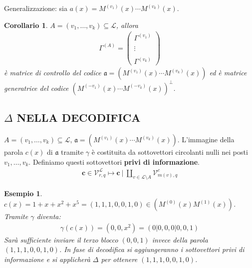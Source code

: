 \documentclass[mathserif]{beamer}
\newtheorem{esempio}{Esempio}
\newtheorem{corollario}{Corollario}
\begin{document}
\begin{frame}
  Generalizzazione: sia $a(x) = M^{(v_{1})}(x) \cdots M^{(v_{k})}(x)$.

    \begin{corollario}
      $A=(v_{1}, \dots, v_{k}) \subseteq \mathscr{L}$, allora
      \begin{align*}
	  \Gamma^{(A)}
	  =
	  \left(
	  \begin{array} { c }
	  \Gamma^{(v_{1})}  \\ \\
	  \vdots \\ \\
	  \Gamma^{(v_{k})}
	  \end{array}
	  \right)
      \end{align*}
      è matrice di controllo del codice $\mathfrak{a} = (  M^{(v_{1})}(x) \cdots M^{(v_{k})}(x) )$
      ed è matrice generatrice del codice $(  M^{(-v_{1})}(x)\cdots M^{(-v_{k})}(x) )^{\perp}$.
    \end{corollario}
\end{frame}




\subsection{$\Delta$ NELLA DECODIFICA}
\begin{frame}
   $A=(v_{1}, \dots, v_{k}) \subseteq \mathscr{L}$, $\mathfrak{a} = (  M^{(v_{1})}(x) \cdots  M^{(v_{k})}(x) )$.
   L'immagine della parola $c(x)$ di $\mathfrak{a}$ tramite $\gamma$ è costituita da sottovettori circolanti nulli nei posti $v_{1}, \dots, v_{k}$. Definiamo questi sottovettori {\bf privi di informazione}.
    \begin{align*}
      \mathbf{c} \in \mathcal{V}_{r, q}^{\mathscr{L}}
      \mapsto
      \mathbf{c} ~ \Bigg|~ \coprod_{v\in \mathscr{L} \setminus A} \mathcal{V}_{m(v), q}^{c}
    \end{align*}
\end{frame}



\begin{frame}
    \begin{esempio}
      $c(x) = 1 + x + x^2 + x^5 = (1,1,1,0,0,1,0)\in (M^{(0)}(x)M^{(1)}(x))$.\\ Tramite $\gamma$ diventa:
      \begin{align*}
	  \gamma(c(x)) = (0,0,x^2) = (0|0,0,0|0,0,1)
      \end{align*}
      Sarà sufficiente inviare il terzo blocco $(0,0,1)$ invece della parola $(1,1,1,0,0,1,0)$. In fase di decodifica si aggiungeranno i sottovettori privi di informazione e si applicherà $\Delta$ per ottenere $(1,1,1,0,0,1,0)$.
    \end{esempio}
\end{frame}
\end{document}

